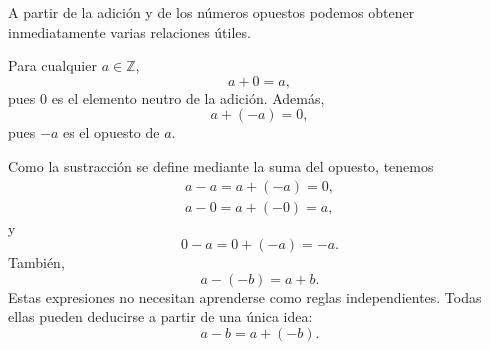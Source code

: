 A partir de la adición y de los números opuestos podemos obtener inmediatamente varias relaciones útiles.

Para cualquier \(a\in\mathbb{Z}\),
\[
a+0=a,
\]
pues \(0\) es el elemento neutro de la adición.
Además,
\[
a+(-a)=0,
\]
pues \(-a\) es el opuesto de \(a\).

Como la sustracción se define mediante la suma del opuesto, tenemos
\begin{align*}
a-a=a+(-a)=0,\\
a-0=a+(-0)=a,
\end{align*}
y
\[
0-a=0+(-a)=-a.
\]
También,
\[
a-(-b)=a+b.
\]
Estas expresiones no necesitan aprenderse como reglas independientes. Todas ellas pueden deducirse a partir de una única idea:
\[
a-b=a+(-b).
\]

